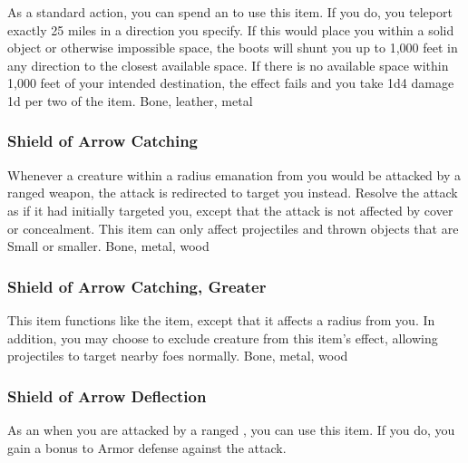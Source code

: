 As a standard action, you can spend an  to use this item.
If you do, you teleport exactly 25 miles in a direction you specify.
If this would place you within a solid object or otherwise impossible space, the boots will shunt you up to 1,000 feet in any direction to the closest available space.
If there is no available space within 1,000 feet of your intended destination, the effect fails and you take 1d4 damage \plus1d per two  of the item.
 
 Bone, leather, metal
\lowercase{\hypertarget{item:Shield of Arrow Catching}{}}\label{item:Shield of Arrow Catching}
\hypertarget{item:Shield of Arrow Catching}{\subsubsection{Shield of Arrow Catching\hfill{}}}
Whenever a creature within a \areamed radius emanation from you would be attacked by a ranged weapon, the attack is redirected to target you instead.
Resolve the attack as if it had initially targeted you, except that the attack is not affected by cover or concealment.
This item can only affect projectiles and thrown objects that are Small or smaller.
 
 Bone, metal, wood
\lowercase{\hypertarget{item:Shield of Arrow Catching, Greater}{}}\label{item:Shield of Arrow Catching, Greater}
\hypertarget{item:Shield of Arrow Catching, Greater}{\subsubsection{Shield of Arrow Catching, Greater\hfill{}}}
This item functions like the  item, except that it affects a \arealarge radius from you.
In addition, you may choose to exclude creature from this item's effect, allowing projectiles to target nearby foes normally.
 
 Bone, metal, wood
\lowercase{\hypertarget{item:Shield of Arrow Deflection}{}}\label{item:Shield of Arrow Deflection}
\hypertarget{item:Shield of Arrow Deflection}{\subsubsection{Shield of Arrow Deflection\hfill{}}}
As an  when you are attacked by a ranged , you can use this item.
If you do, you gain a  bonus to Armor defense against the attack.
